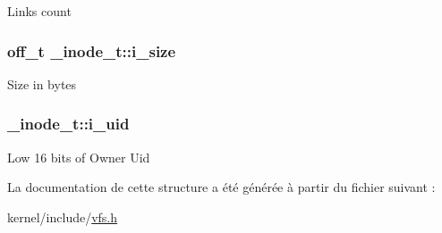 Links count \hypertarget{struct__inode__t_aed37b31c96c90873201abfc8b4b3e463}{
\subsubsection[{i\-\_\-size}]{\setlength{\rightskip}{0pt plus 5cm}off\-\_\-t \-\_\-inode\-\_\-t\-::i\-\_\-size}}\label{struct__inode__t_aed37b31c96c90873201abfc8b4b3e463}
Size in bytes \hypertarget{struct__inode__t_a7ddcb65050ac0b4c9cfbacd495d56f4b}{
\subsubsection[{i\-\_\-uid}]{ \-\_\-inode\-\_\-t\-::i\-\_\-uid}}\label{struct__inode__t_a7ddcb65050ac0b4c9cfbacd495d56f4b}
Low 16 bits of Owner Uid 

La documentation de cette structure a été générée à partir du fichier suivant \-:\begin{DoxyCompactItemize}
\item 
kernel/include/\hyperlink{vfs_8h}{vfs.\-h}\end{DoxyCompactItemize}
